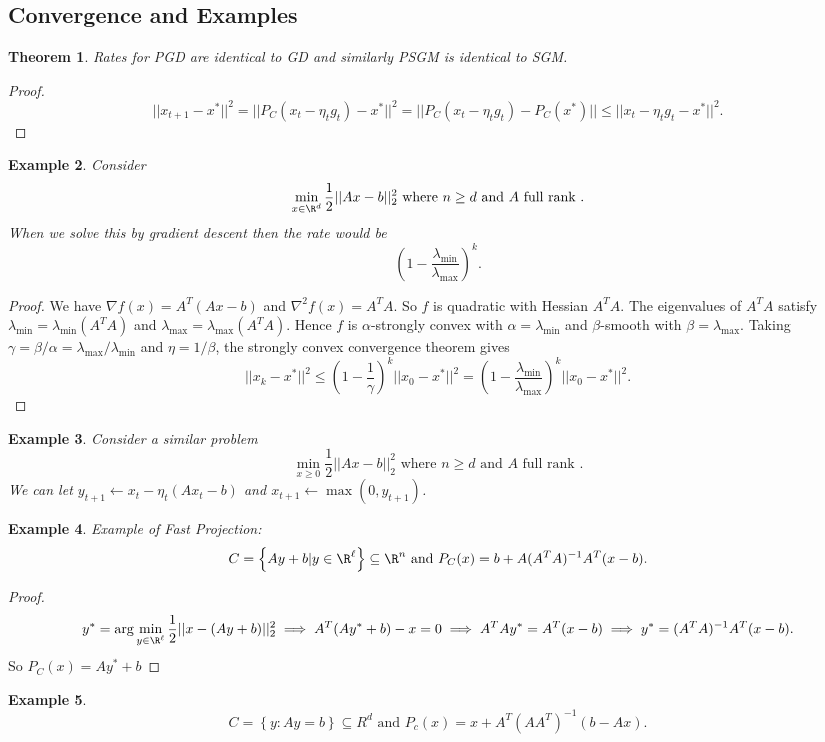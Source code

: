 \documentclass[a4paper]{article}
\newtheorem{thm}{Theorem}[section]
\newtheorem{eg}[thm]{Example}
\begin{document}
\subsection{Convergence and Examples}
\begin{thm}
    Rates for PGD are identical to GD and similarly PSGM is identical to SGM. 
\end{thm}
\begin{proof}
    \[
    ||x_{t+1}-x^*||^2=||P_C(x_t-\eta_t g_t)-x^*||^2=||P_C(x_t-\eta_t g_t)-P_C(x^*)||\leq ||x_t-\eta_tg_t-x^*||^2
    .\] 
\end{proof}
\begin{eg}
    Consider \[
    \min_{x\in \R^d} \frac{1}{2}||Ax-b||_2^2 \text{ where } n\geq d \text{ and } A \text{ full rank }
    .\] 
    When we solve this by gradient descent then the rate would be \[
    \left( 1-\frac{\lambda_{\text{min}}}{\lambda_{\text{max}}} \right)^k
    .\] 
\end{eg}
\begin{proof}
    We have $\nabla f(x)=A^T(Ax-b)$ and $\nabla^2 f(x)=A^TA$. So $f$ is quadratic with Hessian $A^TA$. The eigenvalues of $A^TA$ satisfy $\lambda_{\min}=\lambda_{\min}(A^TA)$ and $\lambda_{\max}=\lambda_{\max}(A^TA)$. Hence $f$ is $\alpha$-strongly convex with $\alpha=\lambda_{\min}$ and $\beta$-smooth with $\beta=\lambda_{\max}$. Taking $\gamma=\beta/\alpha=\lambda_{\max}/\lambda_{\min}$ and $\eta=1/\beta$, the strongly convex convergence theorem gives \[
    ||x_k-x^*||^2\leq \left(1-\frac{1}{\gamma}\right)^k ||x_0-x^*||^2
    =\left(1-\frac{\lambda_{\min}}{\lambda_{\max}}\right)^k ||x_0-x^*||^2.
    \]
\end{proof}
\begin{eg}
    Consider a similar problem \[
    \min_{x\geq 0 } \frac{1}{2}||Ax-b||_2^2 \text{ where } n\geq d \text{ and } A \text{ full rank }
    .\] 
    We can let $y_{t+1}\leftarrow x_t-\eta_t (Ax_t-b)$ and $x_{t+1}\leftarrow \max(0,y_{t+1})$.
\end{eg}
\begin{eg}
    Example of Fast Projection:
    \[
    C= \left\{Ay+b | y\in \R^\ell \right\}\subseteq \R^n \text{ and } P_C(x)=b+A(A^TA)^{-1}A^T(x-b)
    .\] 
\end{eg}
\begin{proof}
    \[
    y^*=\arg\min_{y\in \R^\ell} \frac{1}{2}||x-(Ay+b)||_2^2\implies A^T(Ay^*+b)-x=0 \implies A^TAy^*=A^T(x-b)\implies y^*=(A^TA)^{-1}A^T(x-b)
    .\] 
    So $P_C(x)=Ay^*+b$
\end{proof}
\begin{eg}
    \[
        C= \left\{y: Ay=b\right\}\subseteq R^d \text{ and } P_c(x)=x+A^T(AA^T)^{-1}(b-Ax)
    .\] 
\end{eg}
\newpage
\end{document}
